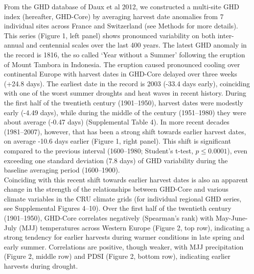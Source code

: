 \documentclass[final]{nature}
\begin{document}
\indent From the GHD database of Daux et al 2012\cite{Daux2012}, we constructed a multi-site GHD index (hereafter, GHD-Core) by averaging harvest date anomalies from 7 individual sites across France and Switzerland (see Methods for more details). This series (Figure 1, left panel) shows pronounced variability on both inter-annual and centennial scales over the last 400 years. The latest GHD anomaly in the record is 1816, the so called `Year without a Summer' following the eruption of Mount Tambora in Indonesia\cite{Oppenheimer2003}. The eruption caused pronounced cooling over continental Europe with harvest dates in GHD-Core delayed over three weeks (+24.8 days). The earliest date in the record is 2003 (-33.4 days early), coinciding with one of the worst summer droughts and heat waves in recent history\cite{Rebetz2006}. During the first half of the twentieth century (1901--1950), harvest dates were modestly early (-4.49 days), while during the middle of the century (1951--1980) they were about average (-0.47 days) (Supplemental Table 4). In more recent decades (1981--2007), however, that has been a strong shift towards earlier harvest dates, on average -10.6 days earlier (Figure 1, right panel). This shift is significant compared to the previous interval (1600--1980; Student's t-test, $p\le0.0001$), even exceeding one standard deviation (7.8 days) of GHD variability during the baseline averaging period (1600--1900).\\
\indent Coinciding with this recent shift towards earlier harvest dates is also an apparent change in the strength of the relationships between GHD-Core and various climate variables in the CRU climate grids (for individual regional GHD series, see Supplemental Figures 4--10). Over the first half of the twentieth century (1901--1950), GHD-Core correlates negatively (Spearman's rank) with May-June-July (MJJ) temperatures across Western Europe (Figure 2, top row), indicating a strong tendency for earlier harvests during warmer conditions in late spring and early summer. Correlations are positive, though weaker, with MJJ precipitation (Figure 2, middle row) and PDSI (Figure 2, bottom row), indicating earlier harvests during drought.\\
\end{document}
